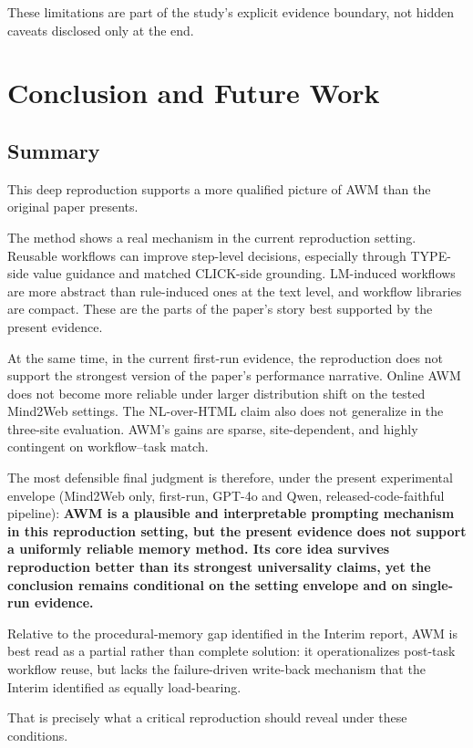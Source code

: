 \documentclass{article}
\begin{document}
These limitations are part of the study's explicit evidence boundary,
not hidden caveats disclosed only at the end.

\section{Conclusion and Future
Work}\label{conclusion-and-future-work}

\subsection{Summary}\label{summary}

This deep reproduction supports a more qualified picture of AWM than the
original paper presents.

The method shows a real mechanism in the current reproduction setting.
Reusable workflows can improve step-level decisions, especially through
TYPE-side value guidance and matched CLICK-side grounding. LM-induced
workflows are more abstract than rule-induced ones at the text level,
and workflow libraries are compact. These are the parts of the paper's
story best supported by the present evidence.

At the same time, in the current first-run evidence, the reproduction
does not support the strongest version of the paper's performance
narrative. Online AWM does not become more reliable under larger
distribution shift on the tested Mind2Web settings. The NL-over-HTML
claim also does not generalize in the three-site evaluation. AWM's gains
are sparse, site-dependent, and highly contingent on workflow--task
match.

The most defensible final judgment is therefore, under the present
experimental envelope (Mind2Web only, first-run, GPT-4o and Qwen,
released-code-faithful pipeline):
\textbf{AWM is a plausible and interpretable prompting mechanism in
this reproduction setting, but the present evidence does not support a
uniformly reliable memory method. Its core idea survives reproduction
better than its strongest universality claims, yet the conclusion
remains conditional on the setting envelope and on single-run
evidence.}

Relative to the procedural-memory gap identified in the Interim report,
AWM is best read as a partial rather than complete solution: it
operationalizes post-task workflow reuse, but lacks the failure-driven
write-back mechanism that the Interim identified as equally
load-bearing.

That is precisely what a critical reproduction should reveal under
these conditions.
\end{document}
